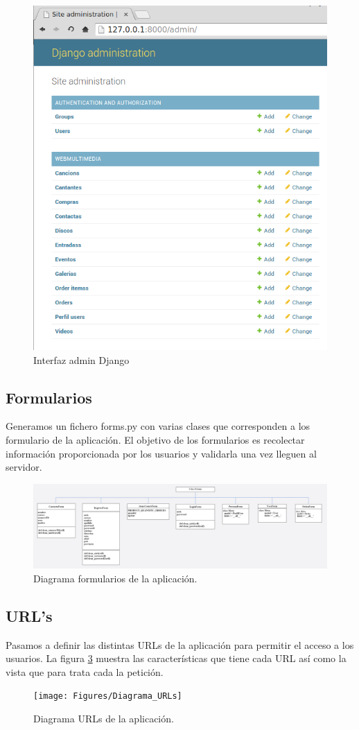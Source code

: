 \begin{figure}[!h]
\begin{center}
   \includegraphics[width=0.3\linewidth]{Figures/admin_importModels}
  \decoRule
  \caption[Interfaz admin Django]{Interfaz admin Django}
\label{fig:Admin_Django}
\end{center}
\end{figure}
\subsection*{Formularios}
Generamos un fichero forms.py con varias clases que corresponden a los formulario de la aplicación. El objetivo de los formularios es recolectar información proporcionada por los usuarios y validarla una vez lleguen al servidor.
\begin{figure}[!h]
\begin{center}
   \includegraphics[width=1\linewidth]{Figures/diagrama_formularios}
  \decoRule
  \caption[Diagrama formularios de la aplicación.]{Diagrama formularios de la aplicación.}
\label{fig:diagrama_formularios}
\end{center}
\end{figure}
\subsection*{URL's}
Pasamos a definir las distintas URLs de la aplicación para permitir el acceso a los usuarios. La figura \ref{fig:Diagrama_URLs} muestra las características que tiene cada URL así como la vista que para trata cada la petición.
\begin{figure}[!h]
\begin{center}
   \texttt{[image: Figures/Diagrama\_URLs]}
  \decoRule
  \caption[Diagrama URLs de la aplicación.]{Diagrama URLs de la aplicación.}
\label{fig:Diagrama_URLs}
\end{center}
\end{figure}
